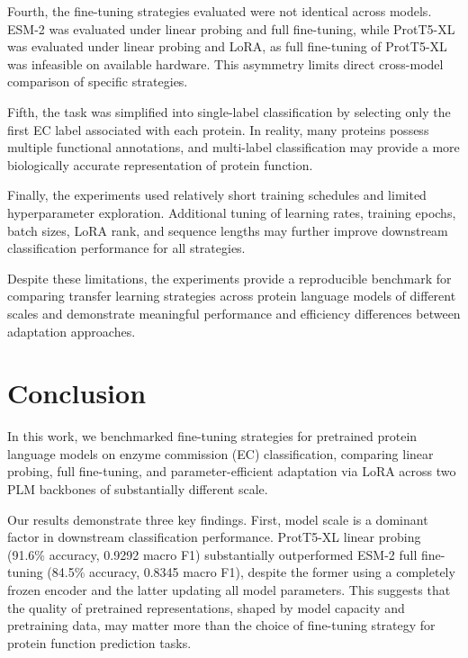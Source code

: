 \documentclass{article}
\begin{document}
Fourth, the fine-tuning strategies evaluated were not identical across models. ESM-2 was evaluated under linear probing and full fine-tuning, while ProtT5-XL was evaluated under linear probing and LoRA, as full fine-tuning of ProtT5-XL was infeasible on available hardware. This asymmetry limits direct cross-model comparison of specific strategies.

Fifth, the task was simplified into single-label classification by selecting only the first EC label associated with each protein. In reality, many proteins possess multiple functional annotations, and multi-label classification may provide a more biologically accurate representation of protein function.

Finally, the experiments used relatively short training schedules and limited hyperparameter exploration. Additional tuning of learning rates, training epochs, batch sizes, LoRA rank, and sequence lengths may further improve downstream classification performance for all strategies.

Despite these limitations, the experiments provide a reproducible benchmark for comparing transfer learning strategies across protein language models of different scales and demonstrate meaningful performance and efficiency differences between adaptation approaches.

\section{Conclusion}

In this work, we benchmarked fine-tuning strategies for pretrained protein language models on enzyme commission (EC) classification, comparing linear probing, full fine-tuning, and parameter-efficient adaptation via LoRA across two PLM backbones of substantially different scale.

Our results demonstrate three key findings. First, model scale is a dominant factor in downstream classification performance. ProtT5-XL linear probing (91.6\% accuracy, 0.9292 macro F1) substantially outperformed ESM-2 full fine-tuning (84.5\% accuracy, 0.8345 macro F1), despite the former using a completely frozen encoder and the latter updating all model parameters. This suggests that the quality of pretrained representations, shaped by model capacity and pretraining data, may matter more than the choice of fine-tuning strategy for protein function prediction tasks.
\end{document}
